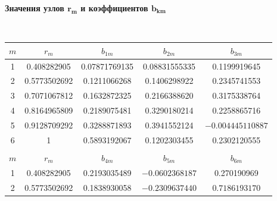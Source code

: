 \begin{table}[h!]

\centering

\hypertarget{anton:table}{}

\begin{minipage}[h]{115mm} \small \centering

{\bf Значения узлов $\boldsymbol{ r_{m}}$ и коэффициентов $\boldsymbol{b_{km}}$   

} \\



\begin{tabular}{c||c|c|c|c}

\hline $m$ & $r_{m}$ & $b_{1m}$ & $b_{2m}$ & $b_{3m}$  \\

\hline\hline

1 & 0.408282905 & 0.07871769135 & 0.08831555335 & 0.1199919645 \\

2 & 0.5773502692 & 0.1211066268 & 0.1406298922 & 0.2345741553 \\

3 & 0.7071067812 & 0.1632872325 & 0.2166388620 & 0.3175338764 \\

4 & 0.8164965809 & 0.2189075481 & 0.3290180214 & 0.2258865716 \\

5 & 0.9128709292 & 0.3288871893 & 0.3941552124 & $-0.004445110887$ \\

6 & 1 & 0.5893192067 & 0.1202303455 & 0.2302120555 \\

\hline

\multicolumn{1}{c}{}\\

\hline $m$ & $r_{m}$ & $b_{4m} $ & $b_{5m}$ & $b_{6m}$ \\

\hline\hline

1 & 0.408282905 &  0.2193035489 & $-0.0602368187$ & 0.270190969 \\

2 & 0.5773502692 & 0.1838930058 & $-0.2309637440$ & $0.7186193170$ \\


\end{tabular}
\end{minipage}
\end{table}
